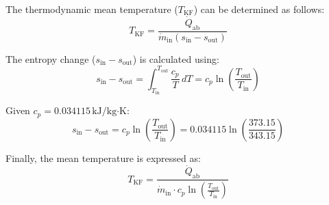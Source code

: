 The thermodynamic mean temperature (\( T_{\text{KF}} \)) can be determined as follows:  
\[
T_{\text{KF}} = \frac{\dot{Q}_{\text{ab}}}{\dot{m}_{\text{in}} \left( s_{\text{in}} - s_{\text{out}} \right)}  
\]  

The entropy change (\( s_{\text{in}} - s_{\text{out}} \)) is calculated using:  
\[
s_{\text{in}} - s_{\text{out}} = \int_{T_{\text{in}}}^{T_{\text{out}}} \frac{c_p}{T} \, dT = c_p \ln \left( \frac{T_{\text{out}}}{T_{\text{in}}} \right)
\]  

Given \( c_p = 0.034115 \, \text{kJ/kg·K} \):  
\[
s_{\text{in}} - s_{\text{out}} = c_p \ln \left( \frac{T_{\text{out}}}{T_{\text{in}}} \right) = 0.034115 \ln \left( \frac{373.15}{343.15} \right)
\]  

Finally, the mean temperature is expressed as:  
\[
T_{\text{KF}} = \frac{\dot{Q}_{\text{ab}}}{\dot{m}_{\text{in}} \cdot c_p \ln \left( \frac{T_{\text{out}}}{T_{\text{in}}} \right)}
\]